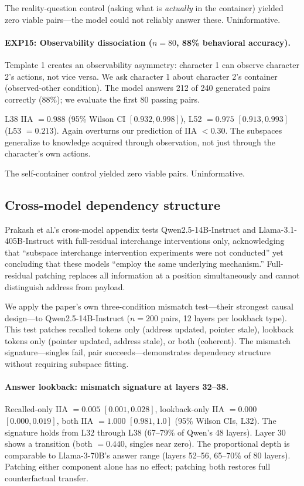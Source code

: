 \documentclass{article}
\begin{document}
The reality-question control (asking what is \emph{actually} in the container) yielded zero viable pairs---the model could not reliably answer these. Uninformative.

\paragraph{EXP15: Observability dissociation ($n = 80$, 88\% behavioral accuracy).}
Template 1 creates an observability asymmetry: character 1 can observe character 2's actions, not vice versa. We ask character 1 about character 2's container (observed-other condition). The model answers 212 of 240 generated pairs correctly (88\%); we evaluate the first 80 passing pairs.

L38 IIA $= 0.988$ (95\% Wilson CI $[0.932, 0.998]$), L52 $= 0.975$ $[0.913, 0.993]$ (L53 $= 0.213$). Again overturns our prediction of IIA $< 0.30$. The subspaces generalize to knowledge acquired through observation, not just through the character's own actions.

The self-container control yielded zero viable pairs. Uninformative.

\subsection{Cross-model dependency structure}
\label{sec:crossmodel}

Prakash et al.'s cross-model appendix tests Qwen2.5-14B-Instruct and Llama-3.1-405B-Instruct with full-residual interchange interventions only, acknowledging that ``subspace interchange intervention experiments were not conducted'' yet concluding that these models ``employ the same underlying mechanism.'' Full-residual patching replaces all information at a position simultaneously and cannot distinguish address from payload.

We apply the paper's own three-condition mismatch test---their strongest causal design---to Qwen2.5-14B-Instruct ($n = 200$ pairs, 12 layers per lookback type). This test patches recalled tokens only (address updated, pointer stale), lookback tokens only (pointer updated, address stale), or both (coherent). The mismatch signature---singles fail, pair succeeds---demonstrates dependency structure without requiring subspace fitting.

\paragraph{Answer lookback: mismatch signature at layers 32--38.}
Recalled-only IIA $= 0.005$ $[0.001, 0.028]$, lookback-only IIA $= 0.000$ $[0.000, 0.019]$, both IIA $= 1.000$ $[0.981, 1.0]$ (95\% Wilson CIs, L32). The signature holds from L32 through L38 (67--79\% of Qwen's 48 layers). Layer 30 shows a transition (both $= 0.440$, singles near zero). The proportional depth is comparable to Llama-3-70B's answer range (layers 52--56, 65--70\% of 80 layers). Patching either component alone has no effect; patching both restores full counterfactual transfer.
\end{document}
